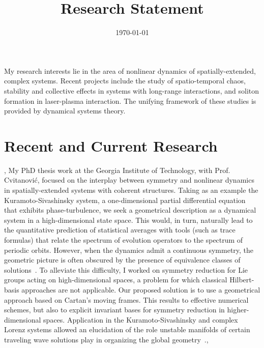\documentclass[11pt,a4paper,final]{moderncv}
\title{Research Statement}               %
\date{\today}
\begin{document}
\maketitle


My research interests lie in the area of nonlinear dynamics of 
spatially-extended, complex systems. Recent projects include 
the study of spatio-temporal chaos, stability and collective effects 
in systems with long-range interactions, and soliton formation in laser-plasma 
interaction. The unifying framework of these studies is provided 
by dynamical systems theory.

\section{Recent and Current Research}
\sep
{}
My PhD thesis work at the Georgia Institute of Technology, 
with Prof. Cvitanovi\'c,
focused on the interplay between symmetry and nonlinear dynamics
in spatially-extended systems with coherent structures. Taking as an example
the Kuramoto-Sivashinsky system, a one-dimensional 
partial differential equation that exhibits phase-turbulence, we seek
a geometrical description as a dynamical system in a high-dimensional 
state space. This would, in turn,
naturally lead to the quantitative prediction of statistical averages with tools
(such as trace formulas) that relate the spectrum of evolution operators to the
spectrum of periodic orbits. However, when the dynamics admit a continuous
symmetry, the geometric picture is often obscured by the presence of equivalence
classes of solutions~\cite{SCD07}. To alleviate this difficulty, I worked on symmetry
reduction for Lie groups acting on high-dimensional spaces, a problem
for which classical Hilbert-basis approaches are not applicable. Our proposed 
solution is to use a geometrical approach based on Cartan's moving frames.
This results to effective numerical schemes, but also to 
explicit invariant bases for symmetry reduction in higher-dimensional spaces. 
Application in the Kuramoto-Sivashinsky and complex Lorenz systems 
allowed an elucidation of the role unstable manifolds of certain traveling wave 
solutions play in organizing the 
global geometry~\cite{SiCvi10,SiminosThesis}.\sep
\end{document}
